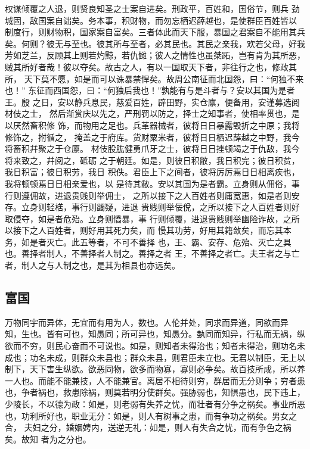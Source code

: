 \documentclass[]{article}
\begin{document}
权谋倾覆之人退，则贤良知圣之士案自进矣。刑政平，百姓和，国俗节，则兵
劲城固，敌国案自诎矣。务本事，积财物，而勿忘栖迟薛越也，是使群臣百姓皆以
制度行，则财物积，国家案自富矣。三者体此而天下服，暴国之君案自不能用其兵
矣。何则？彼无与至也。彼其所与至者，必其民也。其民之亲我，欢若父母，好我
芳如芝兰，反顾其上则若灼黥，若仇雠；彼人之情性也虽桀跖，岂有肯为其所恶，
贼其所好者哉！彼以夺矣。故古之人，有以一国取天下者，非往行之也，修政其所，
天下莫不愿，如是而可以诛暴禁悍矣。故周公南征而北国怨，曰：``何独不来也！''
东征而西国怨，曰：``何独后我也！''孰能有与是斗者与？安以其国为是者王。殷
之日，安以静兵息民，慈爱百姓，辟田野，实仓廪，便备用，安谨募选阅材伎之士，
然后渐赏庆以先之，严刑罚以防之，择士之知事者，使相率贯也，是以厌然畜积修
饰，而物用之足也。兵革器械者，彼将日日暴露毁折之中原；我将修饰之，拊循之，
掩盖之于府库。货财粟米者，彼将日日栖迟薛越之中野，我今将畜积幷聚之于仓廪。
材伎股肱健勇爪牙之士，彼将日日挫顿竭之于仇敌，我今将来致之，幷阅之，砥砺
之于朝廷。如是，则彼日积敝，我日积完；彼日积贫，我日积富；彼日积劳，我日
积佚。君臣上下之间者，彼将厉厉焉日日相离疾也，我将顿顿焉日日相亲爱也，以
是待其敝。安以其国为是者霸。立身则从佣俗，事行则遵佣故，进退贵贱则举佣士，
之所以接下之人百姓者则庸宽惠，如是者则安存。立身则轻楛，事行则蠲疑，进退
贵贱则举佞侻，之所以接下之人百姓者则好取侵夺，如是者危殆。立身则憍暴，事
行则倾覆，进退贵贱则举幽险诈故，之所以接下之人百姓者，则好用其死力矣，而
慢其功劳，好用其籍敛矣，而忘其本务，如是者灭亡。此五等者，不可不善择
也，王、霸、安存、危殆、灭亡之具也。善择者制人，不善择者人制之。善择之者
王，不善择之者亡。夫王者之与亡者，制人之与人制之也，是其为相县也亦远矣。

\hypertarget{header-n48}{%
\subsection{富国}\label{header-n48}}

万物同宇而异体，无宜而有用为人，数也。人伦并处，同求而异道，同欲而异
知，生也。皆有可也，知愚同；所可异也，知愚分。埶同而知异，行私而无祸，纵
欲而不穷，则民心奋而不可说也。如是，则知者未得治也；知者未得治，则功名未
成也；功名未成，则群众未县也；群众未县，则君臣未立也。无君以制臣，无上以
制下，天下害生纵欲。欲恶同物，欲多而物寡，寡则必争矣。故百技所成，所以养
一人也。而能不能兼技，人不能兼官。离居不相待则穷，群居而无分则争；穷者患
也，争者祸也，救患除祸，则莫若明分使群矣。强胁弱也，知惧愚也，民下违上，
少陵长，不以德为政：如是，则老弱有失养之忧，而壮者有分争之祸矣。事业所恶
也，功利所好也，职业无分：如是，则人有树事之患，而有争功之祸矣。男女之合，
夫妇之分，婚姻娉内，送逆无礼：如是，则人有失合之忧，而有争色之祸矣。故知
者为之分也。
\end{document}
